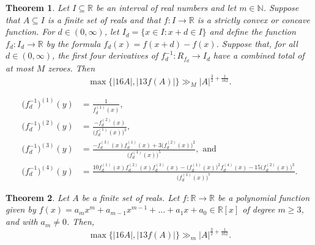 \documentclass[10pt,a4paper]{amsart}
\newtheorem{theorem}{Theorem}
\newcommand{\N}{\mathbb{N}}
\newcommand{\R}{\mathbb{R}}
\begin{document}
\begin{theorem}\label{core}
    Let $I\subseteq\R$ be an interval of real numbers and let $m\in\N$. Suppose
that $A\subseteq I$ is a finite set of reals and that $f : I \rightarrow\R$ is a strictly convex or concave function. For $d\in(0,\infty)$, let $I_d=\{x\in I:x+d\in I\}$ and define the function $f_d:I_d\rightarrow\R$ by the formula $f_d(x) = f(x+d)-f(x)$. Suppose that, for all $d \in (0, \infty)$, the first four derivatives of $f_d^{-1}:R_{f_d}\rightarrow I_d$ have a combined total of at most $M$ zeroes. Then 
\[
    \max \{|16A|, |13f(A)| \} \gg_M |A|^{\frac{3}{2} +\frac{1}{162}}.
    \]
\end{theorem}

\begin{align} 
\big(f_d^{-1}\big)^{(1)}(y)&=\frac{1}{f_d^{(1)}(x)}, \label{d1} \\
    \big(f_d^{-1}\big)^{(2)}(y)&=\frac{-f_d^{(2)}(x)}{\big(f_d^{(1)}(x)\big)^3},  \label{d2}\\ 
    \big(f_d^{-1}\big)^{(3)}(y)&=\frac{-f_d^{(3)}(x)f_d^{(1)}(x)+3\big(f_d^{(2)}(x)\big)^2}{\big(f_d^{(1)}(x)\big)^5},\text{ and} \label{d3} \\
    \big(f_d^{-1}\big)^{(4)}(y)&=\frac{10f_d^{(1)}(x)f_d^{(2)}(x)f_d^{(3)}(x)-\big(f_d^{(1)}(x)\big)^2f_d^{(4)}(x)-15\big(f_d^{(2)}(x)\big)^3}{\big(f_d^{(1)}(x)\big)^7}. \label{d4}
    \end{align}

\begin{theorem}\label{generalpoly}
    Let $A$ be a finite set of reals. Let $f:\R\rightarrow\R$ be a polynomial function given by $f(x)= a_mx^m+a_{m-1}
x^{m-1}+\dotsc+a_1x+a_0\in\R[x]$ of degree $m\ge3$, and with $a_m\neq0$. Then, 
  \[
    \max \{|16A|, |13f(A)| \} \gg_m |A|^{\frac{3}{2} +\frac{1}{162}}.
    \]
\end{theorem}
\end{document}
